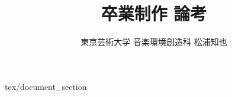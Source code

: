 \documentclass[report,twocolumn]{jsbook}
\title {卒業制作 論考}
\author {東京芸術大学 音楽環境創造科 松浦知也}
\begin{document}
\maketitle

\tableofcontents

 {tex/document_section}
\end{document}
